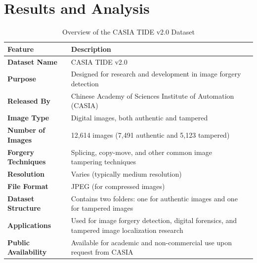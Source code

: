 \documentclass{ieeeaccess}
\begin{document}
\section{Results and Analysis}
\begin{table}[h!]
	\centering
	\setlength{\tabcolsep}{3pt}
	\begin{tabular}{|p{75pt}|p{150pt}|p{115pt}|}
		\hline
		\textbf{Feature}            & \textbf{Description}                                                                 \\ \hline
		\textbf{Dataset Name}       & CASIA TIDE v2.0                                                                      \\ \hline
		\textbf{Purpose}            & Designed for research and development in image forgery detection                     \\ \hline
		\textbf{Released By}        & Chinese Academy of Sciences Institute of Automation (CASIA)                          \\ \hline
		\textbf{Image Type}         & Digital images, both authentic and tampered                                          \\ \hline
		\textbf{Number of Images}   & 12,614 images (7,491 authentic and 5,123 tampered)                                   \\ \hline
		\textbf{Forgery Techniques} & Splicing, copy-move, and other common image tampering techniques                      \\ \hline
		\textbf{Resolution}         & Varies (typically medium resolution)                                                 \\ \hline
		\textbf{File Format}        & JPEG (for compressed images)                                                         \\ \hline
		\textbf{Dataset Structure}  & Contains two folders: one for authentic images and one for tampered images           \\ \hline
		\textbf{Applications}       & Used for image forgery detection, digital forensics, and tampered image localization research \\ \hline
		\textbf{Public Availability} & Available for academic and non-commercial use upon request from CASIA               \\ \hline
	\end{tabular}
	\label{casiav2overview}
	\caption{Overview of the CASIA TIDE v2.0 Dataset}
\end{table}
\end{document}
